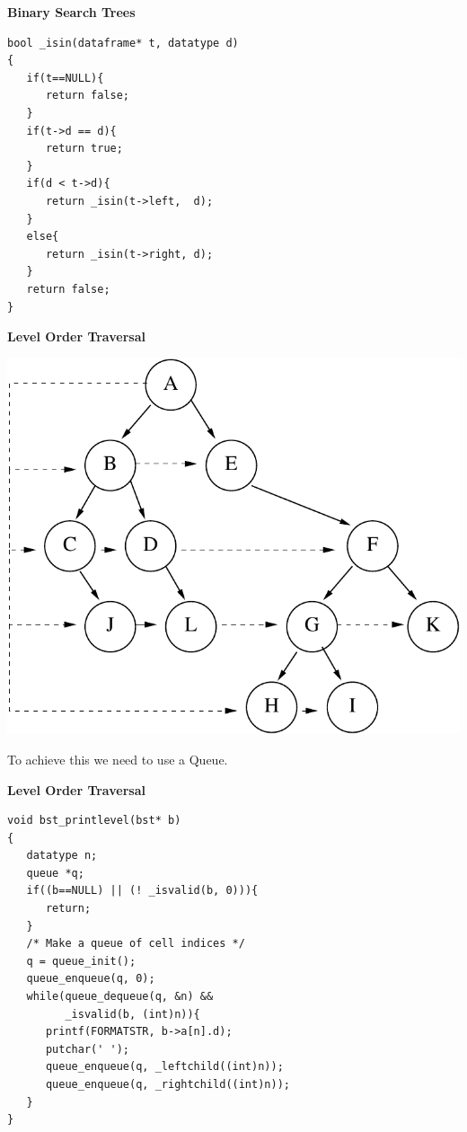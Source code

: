 \newpage	
{\samepage	
\begin{center}	
{\Large{\bf Binary Search Trees}}	
\end{center}	
\begin{verbatim}	
bool _isin(dataframe* t, datatype d)
{
   if(t==NULL){
      return false;
   }
   if(t->d == d){
      return true;
   }
   if(d < t->d){
      return _isin(t->left,  d);
   }
   else{
      return _isin(t->right, d);
   }
   return false;
}
\end{verbatim}	
}	

\newpage	
{\samepage	
\begin{center}	
{\Large{\bf Level Order Traversal}}	
\end{center}	
\begin{center}	
\includegraphics{../Images/treelvl.pdf}	
\end{center}	
To achieve this we need to use a Queue.	
}	

\newpage	
{\samepage	
\begin{center}	
{\Large{\bf Level Order Traversal}}	
\end{center}	
\begin{verbatim}	
void bst_printlevel(bst* b)	
{	
   datatype n;	
   queue *q;	
   if((b==NULL) || (! _isvalid(b, 0))){	
      return;	
   }	
   /* Make a queue of cell indices */	
   q = queue_init();	
   queue_enqueue(q, 0);	
   while(queue_dequeue(q, &n) &&	
         _isvalid(b, (int)n)){	
      printf(FORMATSTR, b->a[n].d);	
      putchar(' ');	
      queue_enqueue(q, _leftchild((int)n));	
      queue_enqueue(q, _rightchild((int)n));	
   }	
}	
\end{verbatim}	
}	

